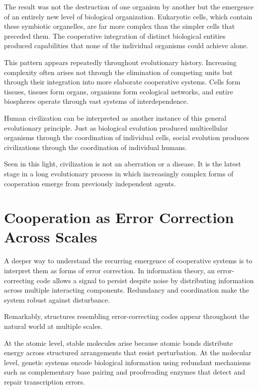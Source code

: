 \documentclass[12pt]{article}
\begin{document}
The result was not the destruction of one organism by another but the emergence of an entirely new level of biological organization. Eukaryotic cells, which contain these symbiotic organelles, are far more complex than the simpler cells that preceded them. The cooperative integration of distinct biological entities produced capabilities that none of the individual organisms could achieve alone.

This pattern appears repeatedly throughout evolutionary history. Increasing complexity often arises not through the elimination of competing units but through their integration into more elaborate cooperative systems. Cells form tissues, tissues form organs, organisms form ecological networks, and entire biospheres operate through vast systems of interdependence.

Human civilization can be interpreted as another instance of this general evolutionary principle. Just as biological evolution produced multicellular organisms through the coordination of individual cells, social evolution produces civilizations through the coordination of individual humans.

Seen in this light, civilization is not an aberration or a disease. It is the latest stage in a long evolutionary process in which increasingly complex forms of cooperation emerge from previously independent agents.

\section{Cooperation as Error Correction Across Scales}

A deeper way to understand the recurring emergence of cooperative systems is to interpret them as forms of error correction. In information theory, an error-correcting code allows a signal to persist despite noise by distributing information across multiple interacting components. Redundancy and coordination make the system robust against disturbance.

Remarkably, structures resembling error-correcting codes appear throughout the natural world at multiple scales.

At the atomic level, stable molecules arise because atomic bonds distribute energy across structured arrangements that resist perturbation. At the molecular level, genetic systems encode biological information using redundant mechanisms such as complementary base pairing and proofreading enzymes that detect and repair transcription errors.
\end{document}
